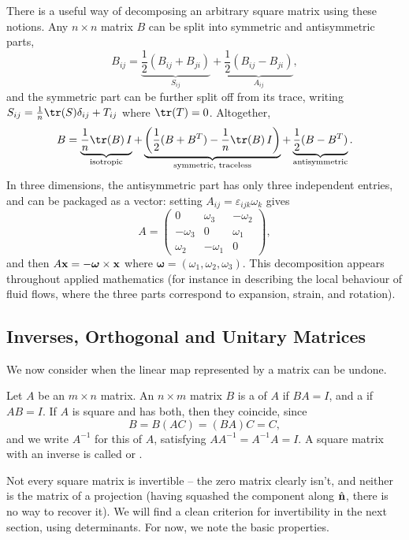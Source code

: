 \documentclass[a4paper]{scrartcl}
\begin{document}
There is a useful way of decomposing an arbitrary square matrix using these notions.
Any $n \times n$ matrix $B$ can be split into symmetric and antisymmetric parts,
$$
B_{ij} = \underbrace{\frac{1}{2}\left(B_{ij} + B_{ji}\right)}_{S_{ij}} + \underbrace{\frac{1}{2}\left(B_{ij} - B_{ji}\right)}_{A_{ij}},
$$
and the symmetric part can be further split off from its trace, writing $S_{ij} = \frac{1}{n}\tr(S)\delta_{ij} + T_{ij}$ where $\tr(T) = 0$. Altogether,
$$
B = \underbrace{\frac{1}{n}\tr(B)\, I}_{\text{isotropic}} + \underbrace{\left(\frac{1}{2}(B + B^T) - \frac{1}{n}\tr(B)\, I\right)}_{\text{symmetric, traceless}} + \underbrace{\frac{1}{2}(B - B^T)}_{\text{antisymmetric}}.
$$
In three dimensions, the antisymmetric part has only three independent entries, and can be packaged as a vector: setting $A_{ij} = \varepsilon_{ijk}\omega_k$ gives
$$
A = \begin{pmatrix}
	0 & \omega_3 & -\omega_2 \\
	-\omega_3 & 0 & \omega_1 \\
	\omega_2 & - \omega_1 & 0
\end{pmatrix},
$$
and then $A \mathbf{x} = -\boldsymbol{\omega} \times \mathbf{x}$ where $\boldsymbol{\omega} = (\omega_1, \omega_2, \omega_3)$. This decomposition appears throughout applied mathematics (for instance in describing the local behaviour of fluid flows, where the three parts correspond to expansion, strain, and rotation).

\subsection{Inverses, Orthogonal and Unitary Matrices}

We now consider when the linear map represented by a matrix can be undone.

\begin{definition}[Inverse]
	Let $A$ be an $m \times n$ matrix. An $n \times m$ matrix $B$ is a  of $A$ if $BA = I$, and a  if $AB = I$. If $A$ is square and has both, then they coincide, since
	$$
	B = B(AC) = (BA)C = C,
	$$
	and we write $A^{-1}$ for this  of $A$, satisfying $A A^{-1} = A^{-1}A = I$. A square matrix with an inverse is called  or .
\end{definition}

Not every square matrix is invertible -- the zero matrix clearly isn't, and neither is the matrix of a projection (having squashed the component along $\hat{\mathbf{n}}$, there is no way to recover it). We will find a clean criterion for invertibility in the next section, using determinants. For now, we note the basic properties.
\end{document}
